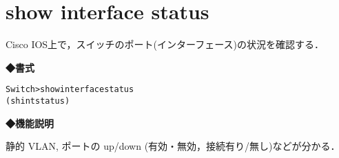 \section{show interface status}
\label{cmd:ios-show-int-status}
Cisco IOS上で，スイッチのポート(インターフェース)の状況を確認する．

\noindent
{\bf ◆書式}
\begin{center}
\begin{screen}
\begin{alltt}
Switch>show interface status
        (sh int status)

\end{alltt}
\end{screen}
\end{center}


{\bf ◆機能説明}

静的 VLAN, ポートの up/down (有効・無効，接続有り/無し)などが分かる．

